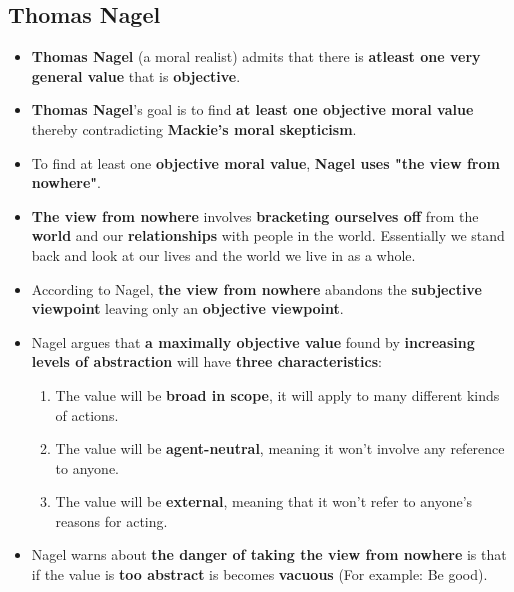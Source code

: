 \documentclass{article}
\begin{document}
    \subsection*{Thomas Nagel}
    \begin{itemize}
        \item \textbf{Thomas Nagel} (a moral realist) admits that there is \textbf{atleast one very general value} that is \textbf{objective}.
        \item \textbf{Thomas Nagel}'s goal is to find \textbf{at least one objective moral value} thereby contradicting \textbf{Mackie's moral skepticism}.
        \item To find at least one \textbf{objective moral value}, \textbf{Nagel uses "the view from nowhere"}.
        \item \textbf{The view from nowhere} involves \textbf{bracketing ourselves off} from the \textbf{world} and our \textbf{relationships} with people in the world. Essentially we stand back and look at our lives and the world we live in as a whole.
        \item According to Nagel, \textbf{the view from nowhere} abandons the \textbf{subjective viewpoint} leaving only an \textbf{objective viewpoint}.
        \item Nagel argues that \textbf{a maximally objective value} found by \textbf{increasing levels of abstraction} will have \textbf{three characteristics}:
        \begin{enumerate}
            \item The value will be \textbf{broad in scope}, it will apply to many different kinds of actions.
            \item The value will be \textbf{agent-neutral}, meaning it won't involve any reference to anyone.
            \item The value will be \textbf{external}, meaning that it won't refer to anyone's reasons for acting.
        \end{enumerate}
        \item Nagel warns about \textbf{the danger of taking the view from nowhere} is that if the value is \textbf{too abstract} is becomes \textbf{vacuous} (For example: Be good).
    \end{itemize}
\end{document}
